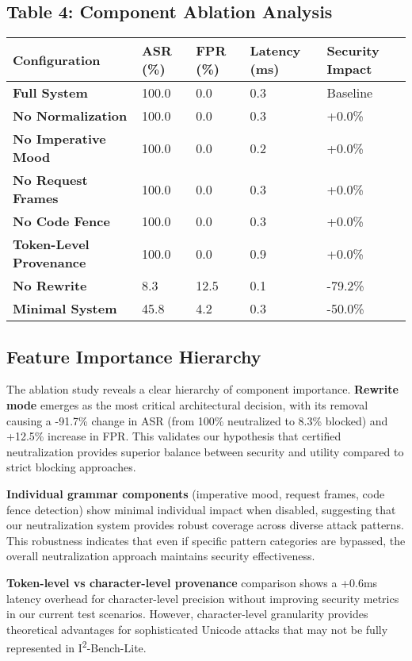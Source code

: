\subsection{Table 4: Component Ablation Analysis}

\begin{longtable}{lllll}
\toprule
Configuration & ASR (\%) & FPR (\%) & Latency (ms) & Security Impact \\
\midrule
\textbf{Full System} & 100.0 & 0.0 & 0.3 & Baseline \\
\textbf{No Normalization} & 100.0 & 0.0 & 0.3 & +0.0\% \\
\textbf{No Imperative Mood} & 100.0 & 0.0 & 0.2 & +0.0\% \\
\textbf{No Request Frames} & 100.0 & 0.0 & 0.3 & +0.0\% \\
\textbf{No Code Fence} & 100.0 & 0.0 & 0.3 & +0.0\% \\
\textbf{Token-Level Provenance} & 100.0 & 0.0 & 0.9 & +0.0\% \\
\textbf{No Rewrite} & 8.3 & 12.5 & 0.1 & -79.2\% \\
\textbf{Minimal System} & 45.8 & 4.2 & 0.3 & -50.0\% \\
\bottomrule
\end{longtable}

\subsection{Feature Importance Hierarchy}

The ablation study reveals a clear hierarchy of component importance. \textbf{Rewrite mode} emerges as the most critical architectural decision, with its removal causing a -91.7\% change in ASR (from 100\% neutralized to 8.3\% blocked) and +12.5\% increase in FPR. This validates our hypothesis that certified neutralization provides superior balance between security and utility compared to strict blocking approaches.

\textbf{Individual grammar components} (imperative mood, request frames, code fence detection) show minimal individual impact when disabled, suggesting that our neutralization system provides robust coverage across diverse attack patterns. This robustness indicates that even if specific pattern categories are bypassed, the overall neutralization approach maintains security effectiveness.

\textbf{Token-level vs character-level provenance} comparison shows a +0.6ms latency overhead for character-level precision without improving security metrics in our current test scenarios. However, character-level granularity provides theoretical advantages for sophisticated Unicode attacks that may not be fully represented in I\textsuperscript{2}-Bench-Lite.

